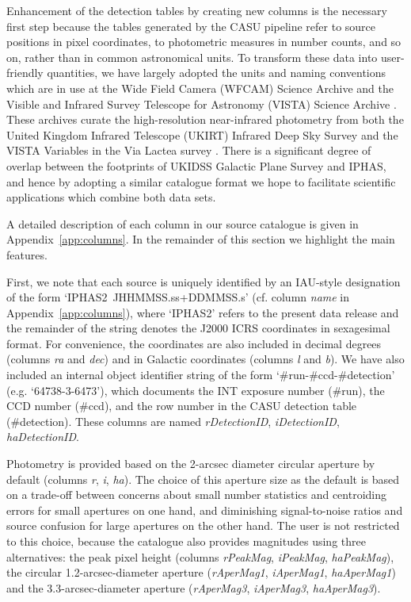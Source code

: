 \documentclass[a4paper,useAMS,usenatbib]{mn2e}
\begin{document}
Enhancement of the detection tables by creating new columns
is the necessary first step because the tables generated by the CASU pipeline
refer to source positions in pixel coordinates, to photometric measures 
in number counts, and so on, rather than in common astronomical units.
To transform these data into user-friendly quantities,
we have largely adopted the units and naming conventions
which are in use at the
Wide Field Camera (WFCAM) Science Archive \citep[WSA;][]{Hambly2008}
and the 
Visible and Infrared Survey Telescope for Astronomy (VISTA)
Science Archive \citep[VSA;][]{Cross2012}.
These archives curate the high-resolution near-infrared photometry from both
the United Kingdom Infrared Telescope (UKIRT)
Infrared Deep Sky Survey \citep[UKIDSS;][]{Lawrence2007}
and the 
VISTA Variables in the Via Lactea survey \cite[VVV;][]{Minniti2010}.
There is a significant degree of overlap
between the footprints of UKIDSS Galactic Plane Survey \citep[GPS;][]{Lucas2008}
and IPHAS,
and hence by adopting a similar catalogue format
we hope to facilitate scientific applications
which combine both data sets.

A detailed description of each column in our source catalogue
is given in Appendix~\ref{app:columns}.
In the remainder of this section we highlight the main features.

First, we note that each source is uniquely identified by an
IAU-style designation of the form `IPHAS2\ JHHMMSS.ss+DDMMSS.s'
(cf. column \emph{name} in Appendix~\ref{app:columns}),
where `IPHAS2' refers to the present
data release and the remainder of the string
denotes the J2000 ICRS coordinates in sexagesimal format.
For convenience, the coordinates
are also included in decimal degrees
(columns \emph{ra} and \emph{dec})
and in Galactic coordinates
(columns \emph{l} and \emph{b}).
We have also included an internal object identifier string 
of the form `\#run-\#ccd-\#detection'
(e.g. `64738-3-6473'),
which documents the INT exposure number (\#run),
the CCD number (\#ccd),
and the row number in the CASU detection table (\#detection).
These columns are named \emph{rDetectionID},
\emph{iDetectionID}, \emph{haDetectionID}.

Photometry is provided based on the 2-arcsec diameter circular aperture
by default (columns \emph{r}, \emph{i}, \emph{ha}).
The choice of this aperture size as the default 
is based on a trade-off between concerns 
about small number statistics and centroiding errors
for small apertures on one hand,
and diminishing signal-to-noise ratios and source confusion
for large apertures on the other hand.
The user is not restricted to this choice, because
the catalogue also provides magnitudes
using three alternatives:
the peak pixel height 
(columns \emph{rPeakMag}, \emph{iPeakMag}, \emph{haPeakMag}),
the circular 1.2-arcsec-diameter aperture 
(\emph{rAperMag1}, \emph{iAperMag1},
 \emph{haAperMag1}) and
the 3.3-arcsec-diameter aperture 
(\emph{rAperMag3}, \emph{iAperMag3},
 \emph{haAperMag3}).
\end{document}
